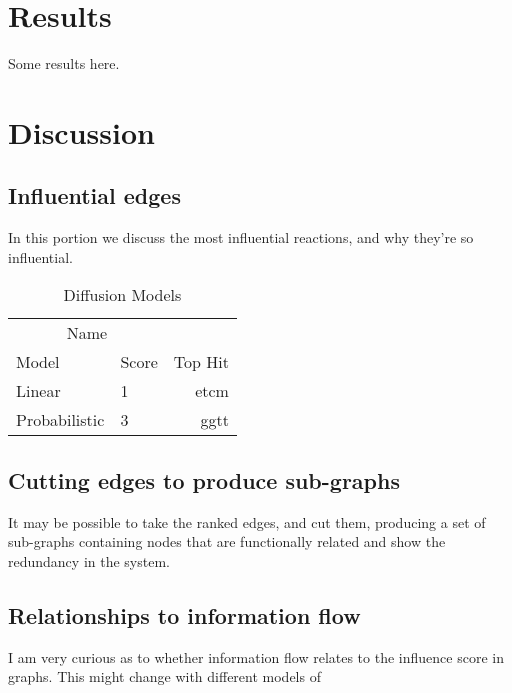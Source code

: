 \documentclass[twoside]{article}
\begin{document}
\begin{multicols}{2}

\section{Results}

Some results here.



\section{Discussion}

\subsection{Influential edges}

In this portion we discuss the most influential reactions, and why
they're so influential.

\begin{table}[H]
\caption{Diffusion Models}
\centering
\begin{tabular}{llr}
\toprule
\multicolumn{2}{c}{Name} \\
\cmidrule(r){1-2}
Model & Score & Top Hit \\
\midrule
Linear & 1 & etcm \\
Probabilistic & 3 & ggtt \\
\bottomrule
\end{tabular}
\end{table}


\subsection{Cutting edges to produce sub-graphs}

It may be possible to take the ranked edges, and cut them, producing a
set of sub-graphs containing nodes that are functionally related and
show the redundancy in the system.

\subsection{Relationships to information flow}

I am very curious as to whether information flow relates to the
influence score in graphs.  This might change with different models of 






\end{multicols}
\end{document}
